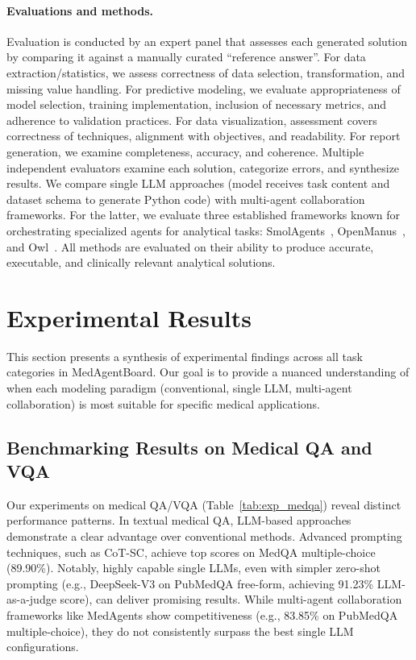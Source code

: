 \documentclass{article}
\begin{document}
\paragraph{Evaluations and methods.} Evaluation is conducted by an expert panel that assesses each generated solution by comparing it against a manually curated ``reference answer''. For data extraction/statistics, we assess correctness of data selection, transformation, and missing value handling. For predictive modeling, we evaluate appropriateness of model selection, training implementation, inclusion of necessary metrics, and adherence to validation practices. For data visualization, assessment covers correctness of techniques, alignment with objectives, and readability. For report generation, we examine completeness, accuracy, and coherence. Multiple independent evaluators examine each solution, categorize errors, and synthesize results. We compare single LLM approaches (model receives task content and dataset schema to generate Python code) with multi-agent collaboration frameworks. For the latter, we evaluate three established frameworks known for orchestrating specialized agents for analytical tasks: SmolAgents~\cite{smolagents}, OpenManus~\cite{openmanus2025}, and Owl~\cite{owl2025}. All methods are evaluated on their ability to produce accurate, executable, and clinically relevant analytical solutions.

\section{Experimental Results}
\label{sec:experimental_results}

This section presents a synthesis of experimental findings across all task categories in MedAgentBoard. Our goal is to provide a nuanced understanding of when each modeling paradigm (conventional, single LLM, multi-agent collaboration) is most suitable for specific medical applications.

\subsection{Benchmarking Results on Medical QA and VQA}
Our experiments on medical QA/VQA (Table~\ref{tab:exp_medqa}) reveal distinct performance patterns. In textual medical QA, LLM-based approaches demonstrate a clear advantage over conventional methods. Advanced prompting techniques, such as CoT-SC, achieve top scores on MedQA multiple-choice (89.90\%). Notably, highly capable single LLMs, even with simpler zero-shot prompting (e.g., DeepSeek-V3 on PubMedQA free-form, achieving 91.23\% LLM-as-a-judge score), can deliver promising results. While multi-agent collaboration frameworks like MedAgents show competitiveness (e.g., 83.85\% on PubMedQA multiple-choice), they do not consistently surpass the best single LLM configurations.
\end{document}
